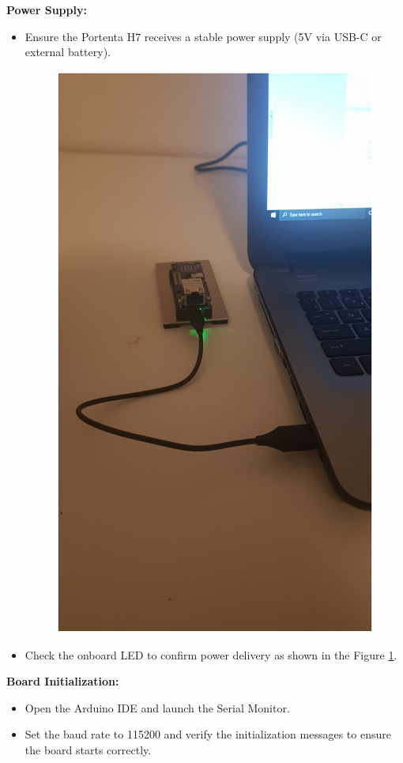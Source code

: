 \textbf{Power Supply:}  
\begin{itemize}[leftmargin=1.5cm]
	\item Ensure the Portenta H7 receives a stable power supply (5V via USB-C or external battery).
	
	\begin{figure}
		\begin{center}
			
			\includegraphics[width=0.4\linewidth]{images/ArduinoIDE/ArduinoPortentaH7Connectedtoalaptop.png}
			\label{Arduino PortentaH7 Connected to a Laptop1}
		\end{center}
		
	\end{figure}
	
	\item Check the onboard LED to confirm power delivery  as shown in the Figure \ref{Arduino PortentaH7 Connected to a Laptop1}.
\end{itemize}

\textbf{Board Initialization:}  
\begin{itemize}[leftmargin=1.5cm]
	\item Open the Arduino IDE and launch the Serial Monitor.
	\item Set the baud rate to 115200 and verify the initialization messages to ensure the board starts correctly.
\end{itemize}

